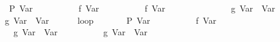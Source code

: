 \documentclass{llncs}
\begin{document}
\begin{isabellebody}
\ \ \ \ \ \ {}\ {}\ {}P\ {}Var\ {}{}{}\isanewline
\ \ \ \ \ \ {}\ {}\ {}{}\ f\ {}Var\ {}{}\isanewline
\ \ \ \ \ \ {}\ {}\ {}{}\ f\ {}Var\ {}{}\isanewline
\ \ \ \ \ \ {}\isanewline
\ \ \ \ {}\ {}\ {}{}\ g\ {}Var\ {}{}\ {}Var\ {}{}\isanewline
\ \ \ \ {}\ {}\ {}{}\ g\ {}Var\ {}{}\ {}Var\ {}{}\isanewline
\ \ \ \ {}\ loop\isanewline
\ \ \ \ \ \ {}\ {}{}P\ {}Var\ {}{}{}\isanewline
\ \ \ \ \ \ {}\ {}\ {}{}\ f\ {}Var\ {}{}\isanewline
\ \ \ \ \ \ {}\ {}\ {}{}\ g\ {}Var\ {}{}\ {}Var\ {}{}\isanewline
\ \ \ \ \ \ {}\ {}\ {}{}\ g\ {}Var\ {}{}\ {}Var\ {}{}\isanewline

\end{isabellebody}
\end{document}
